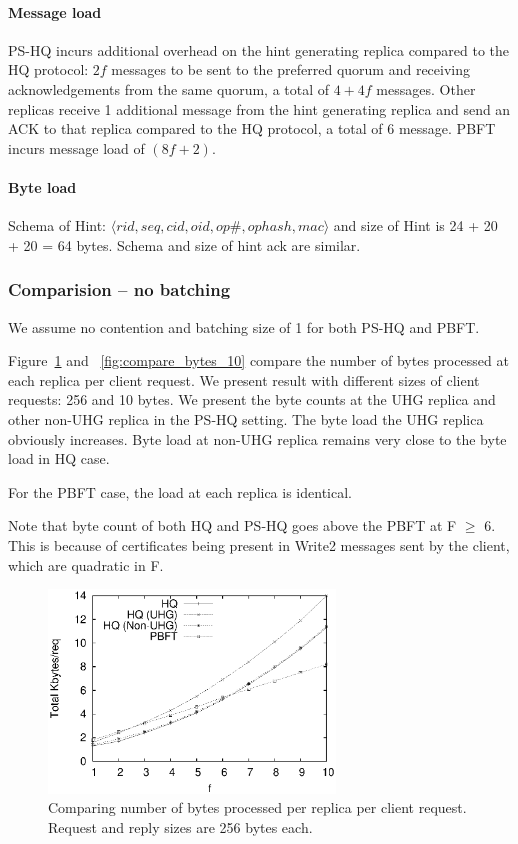 \documentclass[twocolumn,10pt]{article}
\begin{document}
\paragraph{Message load}
PS-HQ incurs additional overhead on the hint generating replica compared to the HQ protocol: 
$2f$ messages to be sent to the preferred quorum and receiving acknowledgements from the same 
quorum, a total of $4+4f$ messages. Other replicas receive 1 additional message from the 
hint generating replica and send an ACK to that replica compared to the HQ protocol, a total
of 6 message. %
PBFT incurs message load of $(8f+2)$. 


\paragraph{Byte load}
Schema of Hint: $\langle rid, seq, cid, oid, op\#, ophash, mac\rangle$ and size of Hint
is 24 + 20 + 20 = 64 bytes. Schema and size of hint ack are similar.


\subsubsection{Comparision -- no batching}
We assume no contention and batching size of 1 for both PS-HQ and PBFT.


Figure~\ref{fig:compare_bytes_256} and ~\ref{fig:compare_bytes_10} compare the number of bytes
processed at each replica per client request. We present result with different sizes of 
client requests: 256 and 10 bytes. We present the byte counts at the UHG replica and other
non-UHG replica in the PS-HQ setting. The byte load the UHG replica obviously increases. 
Byte load at non-UHG replica remains very close to the byte load in HQ case. 

For the PBFT case, the load at each replica is identical.

Note that byte count of both HQ and PS-HQ goes above the PBFT at F $\ge$ 6. This is because of 
certificates being present in Write2 messages sent by the client, which are quadratic in F.


\begin{figure}
\centering
\includegraphics[width=3.0in]{analysis/byte-counts-Payload-256B.ps}
\caption{Comparing number of bytes processed per replica per client request. Request and reply
sizes are
256 bytes each.}
\label{fig:compare_bytes_256}
\end{figure}
\fi
\end{document}
